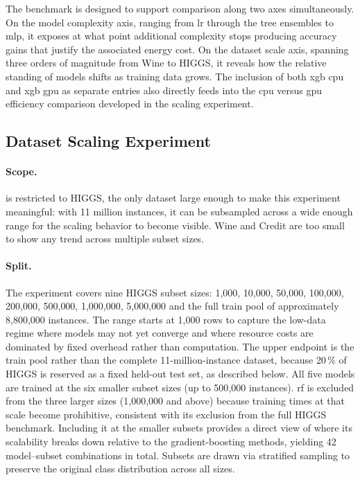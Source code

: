 The benchmark is designed to support comparison along two axes simultaneously. On the model complexity axis, ranging from \gls{lr} through the tree ensembles to \gls{mlp}, it exposes at what point additional complexity stops producing accuracy gains that justify the associated energy cost. On the dataset scale axis, spanning three orders of magnitude from Wine to HIGGS, it reveals how the relative standing of models shifts as training data grows. The inclusion of both \gls{xgb} \gls{cpu} and \gls{xgb} \gls{gpu} as separate entries also directly feeds into the \gls{cpu} versus \gls{gpu} efficiency comparison developed in the scaling experiment.

\subsection{Dataset Scaling Experiment}
\label{design_scaling}

\paragraph{Scope.}
 is restricted to HIGGS, the only dataset large enough to make this experiment meaningful: with 11 million instances, it can be subsampled across a wide enough range for the scaling behavior to become visible. Wine and Credit are too small to show any trend across multiple subset sizes.

\paragraph{Split.}
The experiment covers nine HIGGS subset sizes: 1{,}000, 10{,}000, 50{,}000, 100{,}000, 200{,}000, 500{,}000, 1{,}000{,}000, 5{,}000{,}000 and the full train pool of approximately 8{,}800{,}000 instances. The range starts at 1{,}000 rows to capture the low-data regime where models may not yet converge and where resource costs are dominated by fixed overhead rather than computation. The upper endpoint is the train pool rather than the complete 11-million-instance dataset, because 20\,\% of HIGGS is reserved as a fixed held-out test set, as described below. All five models are trained at the six smaller subset sizes (up to 500{,}000 instances). \gls{rf} is excluded from the three larger sizes (1{,}000{,}000 and above) because training times at that scale become prohibitive, consistent with its exclusion from the full HIGGS benchmark. Including it at the smaller subsets provides a direct view of where its scalability breaks down relative to the gradient-boosting methods, yielding 42 model--subset combinations in total. Subsets are drawn via stratified sampling to preserve the original class distribution across all sizes.


